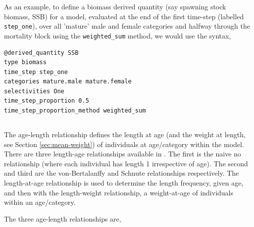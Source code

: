 As an example, to define a biomass derived quantity (say spawning stock biomass, SSB) for a model, evaluated at the end of the first time-step (labelled \texttt{step\_one}), over all 'mature' male and female categories and halfway through the mortality block using the \texttt{weighted\_sum} method, we would use the syntax,

{\small{\begin{verbatim}
@derived_quantity SSB
type biomass
time_step step_one
categories mature.male mature.female
selectivities One
time_step_proportion 0.5
time_step_proportion_method weighted_sum
\end{verbatim}}}

\subsection{\label{sec:age-at-age}}

The age-length relationship defines the length at age (and the weight at length, see Section \ref{sec:mean-weight}) of individuals at age/category within the model. There are three length-age relationships available in \CNAME. The first is the naive no relationship (where each individual has length 1 irrespective of age). The second  and third are the von-Bertalanffy and Schnute relationships respectively. The length-at-age relationship is used to determine the length frequency, given age, and then with the length-weight relationship, a weight-at-age of individuals within an age/category. 

The three age-length relationships are,


